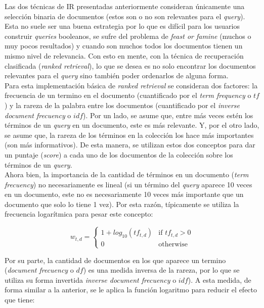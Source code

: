 Las dos técnicas de IR presentadas anteriormente consideran únicamente una selección binaria de documentos (estos son o no son relevantes para el \textit{query}). Esta no suele ser una buena estrategia por lo que es difícil para los usuarios construir \textit{queries} booleanos, se sufre del problema de \textit{feast or famine} (muchos o muy pocos resultados) y cuando son muchos todos los documentos tienen un mismo nivel de relevancia. Con esto en mente, con la técnica de recuperación clasificada (\textit{ranked retrieval}), lo que se desea es no solo encontrar los documentos relevantes para el \textit{query} sino también poder ordenarlos de alguna forma. \\

Para esta implementación básica de \textit{ranked retrieval} se consideran dos factores: la frecuencia de un termino en el documento (cuantificado por el \textit{term frequency} o $tf$) y la rareza de la palabra entre los documentos (cuantificado por el \textit{inverse document frecuency} o $idf$). Por un lado, se asume que, entre más veces estén los términos de un \textit{query} en un documento, este es más relevante. Y, por el otro lado, se asume que, la rareza de los términos en la colección los hace más importantes (son más informativos). De esta manera, se utilizan estos dos conceptos para dar un puntaje (\textit{score}) a cada uno de los documentos de la colección sobre los términos de un \textit{query}. \\

Ahora bien, la importancia de la cantidad de términos en un documento (\textit{term frecuency}) no necesariamente es lineal (si un término del \textit{query} aparece 10 veces en un documento, este no es necesariamente 10 veces más importante que un documento que solo lo tiene 1 vez). Por esta razón, típicamente se utiliza la frecuencia logarítmica para pesar este concepto:

\begin{equation}
    w_{t,d} = \begin{cases} 
            1 + log_{10}( tf_{t,d} ) &\mbox{if } tf_{t,d} > 0  \\
            0 & \mbox{otherwise }  
            \end{cases}
    \label{tf}
\end{equation}

Por su parte, la cantidad de documentos en los que aparece un termino (\textit{document frecuency} o $df$) es una medida inversa de la rareza, por lo que se utiliza su forma invertida \textit{inverse document frecuency} o $idf$). A esta medida, de forma similar a la anterior, se le aplica la función logaritmo para reducir el efecto que tiene:

